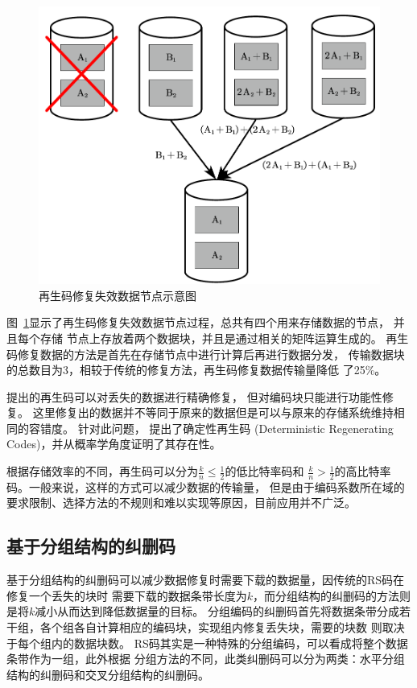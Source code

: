 \begin{figure}[htbp]
	\centering
	\includegraphics [scale=0.6]{figures/1.6.pdf}
	\caption{再生码修复失效数据节点示意图}
	\label{fig:con-1.6}
\end{figure}

图~\ref{fig:con-1.6}显示了再生码修复失效数据节点过程，总共有四个用来存储数据的节点，
并且每个存储
节点上存放着两个数据块，并且是通过相关的矩阵运算生成的。
再生码修复数据的方法是首先在存储节点中进行计算后再进行数据分发，
传输数据块的总数目为3，相较于传统的修复方法，再生码修复数据传输量降低
了25\%。


\citet{dimakis2010network}提出的再生码可以对丢失的数据进行精确修复，
但对编码块只能进行功能性修复。
这里修复出的数据并不等同于原来的数据但是可以与原来的存储系统维持相同的容错度。
针对此问题，
\citet{wu2007deterministic}提出了确定性再生码
(Deterministic Regenerating Codes)，并从概率学角度证明了其存在性。

根据存储效率的不同，再生码可以分为$\frac{k}{n}\leqslant \frac{1}{2}$的低比特率码和
$\frac{k}{n}> \frac{1}{2}$的高比特率码。一般来说，这样的方式可以减少数据的传输量，
但是由于编码系数所在域的要求限制、选择方法的不规则和难以实现等原因，目前应用并不广泛。


\subsection{基于分组结构的纠删码}
基于分组结构的纠删码可以减少数据修复时需要下载的数据量，因传统的RS码在修复一个丢失的块时
需要下载的数据条带长度为$k$，而分组结构的纠删码的方法则是将$k$减小从而达到降低数据量的目标。
分组编码的纠删码首先将数据条带分成若干组，各个组各自计算相应的编码块，实现组内修复丢失块，需要的块数
则取决于每个组内的数据块数。
RS码其实是一种特殊的分组编码，可以看成将整个数据条带作为一组，此外根据
分组方法的不同，此类纠删码可以分为两类：水平分组结构的纠删码和交叉分组结构的纠删码。

